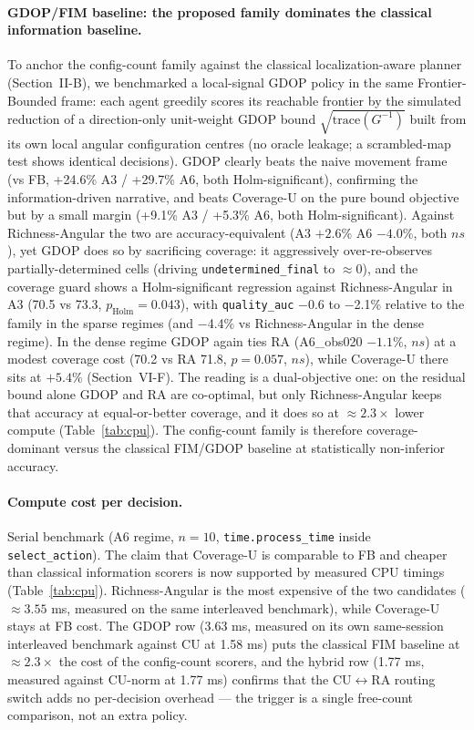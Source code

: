 \documentclass[journal]{IEEEtran}
\newcommand{\CU}{Coverage-U}
\newcommand{\RA}{Richness-Angular}
\begin{document}
\paragraph{GDOP/FIM baseline: the proposed family dominates the classical
information baseline.}
To anchor the config-count family against the classical localization-aware
planner (Section~II-B), we benchmarked a local-signal GDOP policy in the same
Frontier-Bounded frame: each agent greedily scores its reachable frontier by
the simulated reduction of a direction-only unit-weight GDOP bound
$\sqrt{\mathrm{trace}(G^{-1})}$ built from its own local angular configuration
centres (no oracle leakage; a scrambled-map test shows identical decisions).
GDOP clearly beats the naive movement frame (vs FB, +24.6\% A3 / +29.7\% A6,
both Holm-significant), confirming the information-driven narrative, and beats
\CU{} on the pure bound objective but by a small margin (+9.1\% A3 / +5.3\% A6,
both Holm-significant). Against \RA{} the two are accuracy-equivalent (A3
$+2.6\%$ A6 $-4.0\%$, both $ns$), yet GDOP does so by sacrificing coverage: it
aggressively over-re-observes partially-determined cells (driving
\texttt{undetermined\_final} to $\approx 0$), and the coverage guard shows a
Holm-significant regression against \RA{} in A3 (70.5 vs 73.3,
$p_{\text{Holm}} = 0.043$), with \texttt{quality\_auc} $-$0.6 to $-$2.1\%
relative to the family in the sparse regimes (and $-$4.4\% vs \RA{} in the
dense regime). In the dense regime GDOP again ties RA (A6\_obs020
$-1.1\%$, $ns$) at a modest coverage cost (70.2 vs RA 71.8, $p = 0.057$, $ns$),
while \CU{} there sits at $+5.4\%$ (Section~VI-F). The reading is a dual-objective
one: on the residual bound alone GDOP and RA are co-optimal, but only \RA{}
keeps that accuracy at equal-or-better coverage, and it does so at
$\approx 2.3\times$ lower compute (Table~\ref{tab:cpu}). The config-count family
is therefore coverage-dominant versus the classical FIM/GDOP baseline at
statistically non-inferior accuracy.

\paragraph{Compute cost per decision.}
Serial benchmark (A6 regime, $n = 10$, \texttt{time.process\_time} inside
\texttt{select\_action}). The claim that \CU{} is comparable to FB and cheaper
than classical information scorers is now supported by measured CPU timings
(Table~\ref{tab:cpu}). \RA{} is the most expensive of the two candidates
($\approx 3.55$ ms, measured on the same interleaved benchmark), while \CU{}
stays at FB cost. The GDOP row (3.63 ms, measured on its own same-session
interleaved benchmark against CU at 1.58 ms) puts the classical FIM baseline at
$\approx 2.3\times$ the cost of the config-count scorers, and the hybrid row
(1.77 ms, measured against CU-norm at 1.77 ms) confirms that the
CU$\leftrightarrow$RA routing switch adds no per-decision overhead --- the
trigger is a single free-count comparison, not an extra policy.
\end{document}
